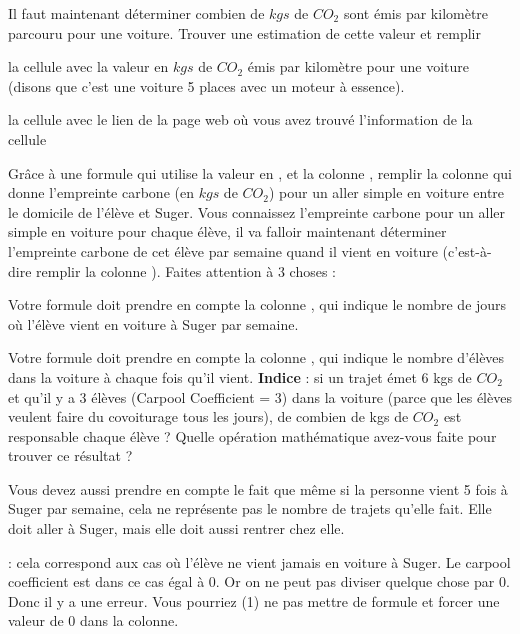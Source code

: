 \documentclass{exam}
\begin{document}
\begin{questions}
  \question Il faut maintenant déterminer combien de $kgs$ de $CO_2$ sont émis par kilomètre parcouru pour une voiture. Trouver une estimation de cette valeur et remplir
  \begin{compactitem}
    \item la cellule  avec la valeur en $kgs$ de $CO_2$ émis par kilomètre pour une voiture (disons que c'est une voiture 5 places avec un moteur à essence).
    \item la cellule  avec le lien de la page web où vous avez trouvé l'information de la cellule 
  \end{compactitem}
  \question Grâce à une formule qui utilise la valeur en , et la colonne , remplir la colonne  qui donne l'empreinte carbone (en $kgs$ de $CO_2$) pour un aller simple en voiture entre le domicile de l'élève et Suger.
  \question Vous connaissez l'empreinte carbone pour un aller simple en voiture pour chaque élève, il va falloir maintenant déterminer l'empreinte carbone de cet élève par semaine quand il vient en voiture (c'est-à-dire remplir la colonne ). Faites attention à 3 choses : 
      \begin{compactitem}
    \item Votre formule doit prendre en compte la colonne , qui indique le nombre de jours où l'élève vient en voiture à Suger par semaine.
    \item Votre formule doit prendre en compte la colonne , qui indique le nombre d'élèves dans la voiture à chaque fois qu'il vient. \textbf{Indice} : si un trajet émet 6 kgs de $CO_2$ et qu'il y a 3 élèves (Carpool Coefficient = 3) dans la voiture (parce que les élèves veulent faire du covoiturage tous les jours), de combien de kgs de $CO_2$ est responsable chaque élève ? Quelle opération mathématique avez-vous faite pour trouver ce résultat ?
    \item Vous devez aussi prendre en compte le fait que même si la personne vient 5 fois à Suger par semaine, cela ne représente pas le nombre de trajets qu'elle fait. Elle doit aller à Suger, mais elle doit aussi rentrer chez elle.
\item {} : cela correspond aux cas où l'élève ne vient jamais en voiture à Suger. Le carpool coefficient est dans ce cas égal à 0.
Or on ne peut pas diviser quelque chose par 0. Donc il y a une erreur. Vous pourriez (1) ne pas mettre de formule et forcer une valeur de 0 dans la colonne. 

\end{compactitem}
\end{questions}
\end{document}
